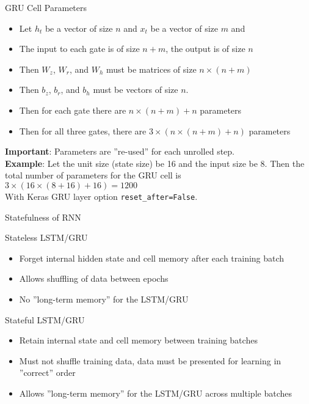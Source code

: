 \documentclass[ignorenonframetext,xcolor=x11names]{beamer}
\begin{document}
\begin{frame}{GRU Cell Parameters}
\small
\begin{itemize}
  \item Let $h_t$ be a vector of size $n$ and $x_t$ be a vector of size $m$ and 
  \item The input to each gate is of size $n+m$, the output is of size $n$
  \item Then $W_z$, $W_r$, and $W_h$ must be matrices of size $n \times (n+m)$
  \item Then $b_z$, $b_r$, and $b_h$ must be vectors of size $n$. 
  \item Then for each gate there are $n \times (n+m) + n$ parameters
  \item Then for all three gates, there are $3 \times (n \times (n+m) + n)$ parameters
\end{itemize}
\textbf{Important}: Parameters are ''re-used'' for each unrolled step.\\

\textbf{Example}: Let the unit size (state size) be 16 and the input size be 8. Then the total number of parameters for the GRU cell is $3 \times (16 \times (8+16) + 16) = 1200$ \\
{\tiny With Keras GRU layer option \texttt{reset\_after=False}.}
\end{frame}

\begin{frame}{Statefulness of RNN}
\small
\begin{block}{Stateless LSTM/GRU}
\begin{itemize}
   \item Forget internal hidden state and cell memory after each training batch
   \item Allows shuffling of data between epochs
   \item No ''long-term memory'' for the LSTM/GRU
\end{itemize}
\end{block}
\begin{block}{Stateful LSTM/GRU}
\begin{itemize}
   \item Retain internal state and cell memory between training batches
   \item Must not shuffle training data, data must be presented for learning in ''correct'' order
   \item Allows ''long-term memory'' for the LSTM/GRU across multiple batches
\end{itemize}
\end{block}
\end{frame}
\end{document}
